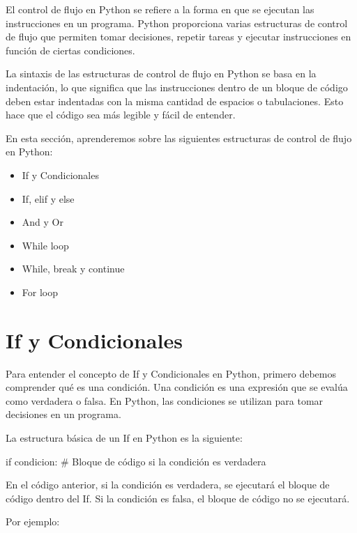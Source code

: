 \documentclass[
  a4paper,
  DIV=11,
  numbers=noendperiod,
  onepage,
  openany]{scrreprt}
\newenvironment{Shaded}{\begin{snugshade}}{\end{snugshade}}
\newcommand{\CommentTok}[1]{\textcolor[rgb]{0.37,0.37,0.37}{#1}}
\newcommand{\ControlFlowTok}[1]{\textcolor[rgb]{0.00,0.23,0.31}{#1}}
\newcommand{\NormalTok}[1]{\textcolor[rgb]{0.00,0.23,0.31}{#1}}
\providecommand{\tightlist}{%
  \setlength{\itemsep}{0pt}\setlength{\parskip}{0pt}}\usepackage{longtable,booktabs,array}
\begin{document}
El control de flujo en Python se refiere a la forma en que se ejecutan
las instrucciones en un programa. Python proporciona varias estructuras
de control de flujo que permiten tomar decisiones, repetir tareas y
ejecutar instrucciones en función de ciertas condiciones.

La sintaxis de las estructuras de control de flujo en Python se basa en
la indentación, lo que significa que las instrucciones dentro de un
bloque de código deben estar indentadas con la misma cantidad de
espacios o tabulaciones. Esto hace que el código sea más legible y fácil
de entender.

En esta sección, aprenderemos sobre las siguientes estructuras de
control de flujo en Python:

\begin{itemize}
\tightlist
\item
  If y Condicionales
\item
  If, elif y else
\item
  And y Or
\item
  While loop
\item
  While, break y continue
\item
  For loop
\end{itemize}

\section{If y Condicionales}\label{if-y-condicionales}

Para entender el concepto de If y Condicionales en Python, primero
debemos comprender qué es una condición. Una condición es una expresión
que se evalúa como verdadera o falsa. En Python, las condiciones se
utilizan para tomar decisiones en un programa.

La estructura básica de un If en Python es la siguiente:

\begin{Shaded}
\begin{Highlighting}[]
\ControlFlowTok{if}\NormalTok{ condicion:}
    \CommentTok{\# Bloque de código si la condición es verdadera}
\end{Highlighting}
\end{Shaded}

En el código anterior, si la condición es verdadera, se ejecutará el
bloque de código dentro del If. Si la condición es falsa, el bloque de
código no se ejecutará.

Por ejemplo:
\end{document}
